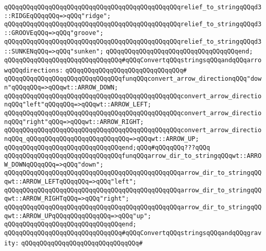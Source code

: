 \verb|qQQqqQQqqQQqqQQqqQQqqQQqqQQqqQQqqQQqqQQqqQQqqQQqrelief_to_stringqQQqd3::RIDGEqQQqqQQq=>qQQq"ridge";|\newline
\verb|qQQqqQQqqQQqqQQqqQQqqQQqqQQqqQQqqQQqqQQqqQQqqQQqrelief_to_stringqQQqd3::GROOVEqQQq=>qQQq"groove";|\newline
\verb|qQQqqQQqqQQqqQQqqQQqqQQqqQQqqQQqqQQqqQQqqQQqqQQqrelief_to_stringqQQqd3::SUNKENqQQq=>qQQq"sunken";|\newline
\verb|qQQqqQQqqQQqqQQqqQQqqQQqqQQqqQQqqQQqend;|\newline
\newline
\verb|qQQqqQQqqQQqqQQqqQQqqQQqqQQqqQQq#qQQqConvertqQQqstringsqQQqandqQQqarrowqQQqdirections:|\newline
\verb|qQQqqQQqqQQqqQQqqQQqqQQqqQQqqQQq#|\newline
\verb|qQQqqQQqqQQqqQQqqQQqqQQqqQQqqQQqfunqQQqconvert_arrow_directionqQQq"down"qQQqqQQq=>qQQqwt::ARROW_DOWN;|\newline
\verb|qQQqqQQqqQQqqQQqqQQqqQQqqQQqqQQqqQQqqQQqqQQqqQQqconvert_arrow_directionqQQq"left"qQQqqQQq=>qQQqwt::ARROW_LEFT;|\newline
\verb|qQQqqQQqqQQqqQQqqQQqqQQqqQQqqQQqqQQqqQQqqQQqqQQqconvert_arrow_directionqQQq"right"qQQq=>qQQqwt::ARROW_RIGHT;|\newline
\verb|qQQqqQQqqQQqqQQqqQQqqQQqqQQqqQQqqQQqqQQqqQQqqQQqconvert_arrow_directionqQQq_qQQqqQQqqQQqqQQqqQQqqQQqqQQq=>qQQqwt::ARROW_UP;|\newline
\verb|qQQqqQQqqQQqqQQqqQQqqQQqqQQqqQQqend;qQQq#qQQqqQQq???qQQq|\newline
\newline
\verb|qQQqqQQqqQQqqQQqqQQqqQQqqQQqqQQqfunqQQqarrow_dir_to_stringqQQqwt::ARROW_DOWNqQQqqQQq=>qQQq"down";|\newline
\verb|qQQqqQQqqQQqqQQqqQQqqQQqqQQqqQQqqQQqqQQqqQQqqQQqarrow_dir_to_stringqQQqwt::ARROW_LEFTqQQqqQQq=>qQQq"left";|\newline
\verb|qQQqqQQqqQQqqQQqqQQqqQQqqQQqqQQqqQQqqQQqqQQqqQQqarrow_dir_to_stringqQQqwt::ARROW_RIGHTqQQq=>qQQq"right";|\newline
\verb|qQQqqQQqqQQqqQQqqQQqqQQqqQQqqQQqqQQqqQQqqQQqqQQqarrow_dir_to_stringqQQqwt::ARROW_UPqQQqqQQqqQQqqQQq=>qQQq"up";|\newline
\verb|qQQqqQQqqQQqqQQqqQQqqQQqqQQqqQQqend;|\newline
\newline
\verb|qQQqqQQqqQQqqQQqqQQqqQQqqQQqqQQq#qQQqConvertqQQqstringsqQQqandqQQqgravity:|\newline
\verb|qQQqqQQqqQQqqQQqqQQqqQQqqQQqqQQq#|\newline
